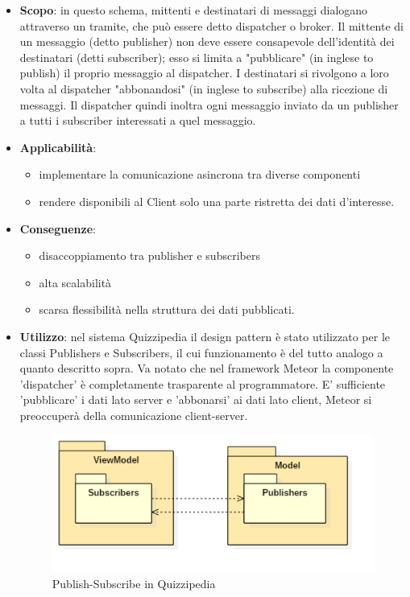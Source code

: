 	\begin{itemize}
		\item\textbf{Scopo}: in questo schema, mittenti e destinatari di messaggi dialogano attraverso un tramite, che può essere detto dispatcher o broker. Il mittente di un messaggio (detto publisher) non deve essere consapevole dell'identità dei destinatari (detti subscriber); esso si limita a "pubblicare" (in inglese to publish) il proprio messaggio al dispatcher. I destinatari si rivolgono a loro volta al dispatcher "abbonandosi" (in inglese to subscribe) alla ricezione di messaggi. Il dispatcher quindi inoltra ogni messaggio inviato da un publisher a tutti i subscriber interessati a quel messaggio.
		\item\textbf{Applicabilità}:
		\begin{itemize}
			\item implementare la comunicazione asincrona tra diverse componenti
			\item rendere disponibili al Client solo una parte ristretta dei dati d'interesse.
		\end{itemize}
		\item\textbf{Conseguenze}:
		\begin{itemize}
			\item disaccoppiamento tra publisher e subscribers
			\item alta scalabilità
			\item scarsa flessibilità nella struttura dei dati pubblicati.
		\end{itemize}
		\item\textbf{Utilizzo}: nel sistema Quizzipedia il design pattern è stato utilizzato per le classi Publishers e Subscribers, il cui funzionamento è del tutto analogo a quanto descritto sopra. Va notato che nel framework Meteor la componente 'dispatcher' è completamente trasparente al programmatore. E' sufficiente 'pubblicare' i dati lato server e 'abbonarsi' ai dati lato client, Meteor si preoccuperà della comunicazione client-server.
		
	\begin{figure}[h!]
	\begin{center}
		\includegraphics[scale=0.8]{../images/PublishSubscribeDesignPattern.png}
		\caption{Publish-Subscribe in Quizzipedia}
	\end{center}
	\end{figure}
	\end{itemize}
	\newpage